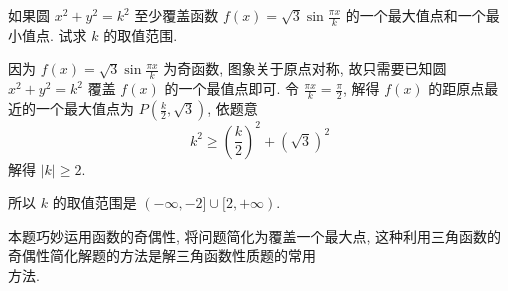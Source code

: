 \begin{example}
	如果圆 $x^{2}+y^{2}=k^{2}$ 至少覆盖函数 $f(x)=\sqrt{3} \sin \frac{\pi x}{k}$ 的一个最大值点和一个最小值点. 试求 $k$ 的取值范围.
\end{example}
\begin{solution}
	因为 $f(x)=\sqrt{3} \sin \frac{\pi x}{k}$ 为奇函数, 图象关于原点对称, 故只需要已知圆 $x^{2}+y^{2}=k^{2}$ 覆盖 $f(x)$ 的一个最值点即可. 令 $\frac{\pi x}{k}=\frac{\pi}{2}$, 解得 $f(x)$ 的距原点最近的一个最大值点为 $P\left(\frac{k}{2}, \sqrt{3}\right)$, 依题意
	$$
		k^{2} \geqslant\left(\frac{k}{2}\right)^{2}+(\sqrt{3})^{2}
	$$
	解得 $|k| \geqslant 2$.

	所以 $k$ 的取值范围是 $(-\infty,-2] \cup[2,+\infty)$.
\end{solution}
\begin{note}
	本题巧妙运用函数的奇偶性, 将问题简化为覆盖一个最大点, 这种利用三角函数的奇偶性简化解题的方法是解三角函数性质题的常用\\
	方法.
\end{note}

